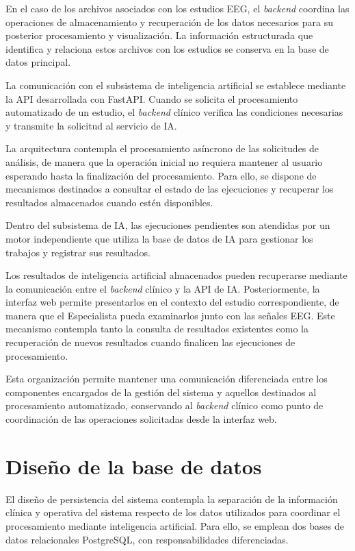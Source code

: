 En el caso de los archivos asociados con los
estudios EEG, el \textit{backend} coordina las operaciones
de almacenamiento y recuperación de los datos
necesarios para su posterior procesamiento
y visualización. La información estructurada
que identifica y relaciona estos archivos
con los estudios se conserva en la base de
datos principal.

La comunicación con el subsistema de inteligencia
artificial se establece mediante la API desarrollada
con FastAPI. Cuando se solicita el procesamiento
automatizado de un estudio, el \textit{backend} clínico
verifica las condiciones necesarias y transmite
la solicitud al servicio de IA.


La arquitectura contempla el procesamiento asíncrono de las solicitudes de análisis, de manera que la operación inicial no requiera mantener al usuario esperando hasta la finalización del procesamiento. Para ello, se dispone de mecanismos destinados a consultar el estado de las ejecuciones y recuperar los resultados almacenados cuando estén disponibles.


Dentro del subsistema de IA, las ejecuciones pendientes son atendidas por un motor independiente
que utiliza la base de datos de IA para gestionar
los trabajos y registrar sus resultados.


Los resultados de inteligencia artificial almacenados pueden recuperarse mediante la comunicación entre el \textit{backend} clínico y la API de IA. Posteriormente, la interfaz web permite presentarlos en el contexto del estudio correspondiente, de manera que el Especialista pueda examinarlos junto con las señales EEG. Este mecanismo contempla tanto la consulta de resultados existentes como la recuperación de nuevos resultados cuando finalicen las ejecuciones de procesamiento.


Esta organización permite mantener una
comunicación diferenciada entre los componentes
encargados de la gestión del sistema y aquellos
destinados al procesamiento automatizado,
conservando al \textit{backend} clínico como punto
de coordinación de las operaciones solicitadas
desde la interfaz web.


\section{Diseño de la base de datos}
\label{sec:diseno-base-datos}

El diseño de persistencia del sistema contempla
la separación de la información clínica y operativa
del sistema respecto de los datos utilizados para
coordinar el procesamiento mediante inteligencia
artificial. Para ello, se emplean dos bases de datos
relacionales PostgreSQL, con responsabilidades
diferenciadas.

